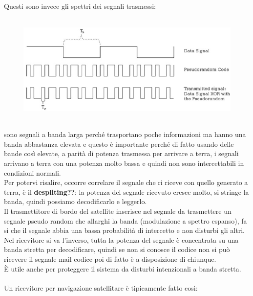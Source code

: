\documentclass[oneside, 12pt]{extbook}
\begin{document}
Questi sono invece gli spettri dei segnali trasmessi:\\\\
\begin{figure}[!h]
	\includegraphics[scale=0.4]{immagini/localization/gps_signals.png}
\end{figure}\\
sono segnali a banda larga perché trasportano poche informazioni ma hanno una banda abbastanza elevata e questo è importante perché di fatto usando delle bande così elevate, a parità di potenza trasmessa per arrivare a terra, i segnali arrivano a terra con una potenza molto bassa e quindi non sono intercettabili in condizioni normali.\\
Per potervi risalire, occorre correlare il segnale che ri riceve con quello generato a terra, è il \textbf{despliting??}: la potenza del segnale ricevuto cresce molto, si stringe la banda, quindi possiamo decodificarlo e leggerlo.\\
Il trasmettitore di bordo del satellite inserisce nel segnale da trasmettere un segnale pseudo random che allarghi la banda (modulazione a spettro espanso), fa si che il segnale abbia una bassa probabilità di intercetto e non disturbi gli altri.\\
Nel ricevitore si va l'inverso, tutta la potenza del segnale è concentrata su una banda stretta per decodificare, quindi se non si conosce il codice non si può ricevere il segnale mail codice poi di fatto è a disposizione di chiunque.\\
È utile anche per proteggere il sistema da disturbi intenzionali a banda stretta.\\\\
Un ricevitore per navigazione satellitare è tipicamente fatto così:\\\\
\end{document}
